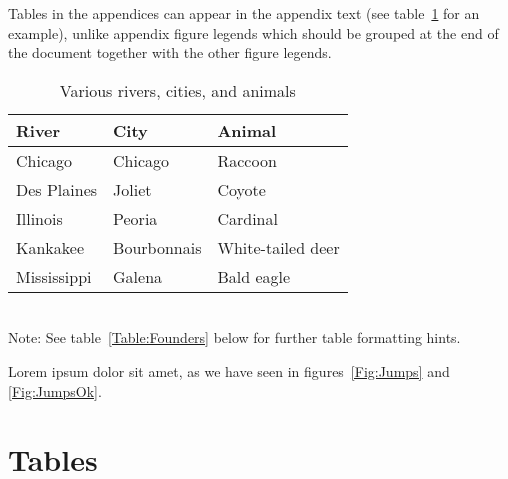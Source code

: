 \documentclass[11pt]{article}
\begin{document}
	Tables in the appendices can appear in the appendix text (see table~\ref{Table:Rivers} for an example), unlike appendix figure legends which should be grouped at the end of the document together with the other figure legends.
	
	\begin{table}[h]
		\caption{Various rivers, cities, and animals}
		\label{Table:Rivers}
		\centering
		\begin{tabular}{lll}\hline
			River        & City        & Animal            \\ \hline
			Chicago      & Chicago     & Raccoon           \\
			Des Plaines  & Joliet      & Coyote            \\
			Illinois     & Peoria      & Cardinal          \\
			Kankakee     & Bourbonnais & White-tailed deer \\
			Mississippi  & Galena      & Bald eagle        \\ \hline
		\end{tabular}
		\bigskip{}
		\\
		{\footnotesize Note: See table~\ref{Table:Founders} below for further table formatting hints.}
	\end{table}
	
	Lorem ipsum dolor sit amet, as we have seen in figures~\ref{Fig:Jumps} and \ref{Fig:JumpsOk}.
	
	


	
	\newpage{}
	
	\section*{Tables}
	\renewcommand{\thetable}{\arabic{table}}
	\setcounter{table}{0}
	
\end{document}
